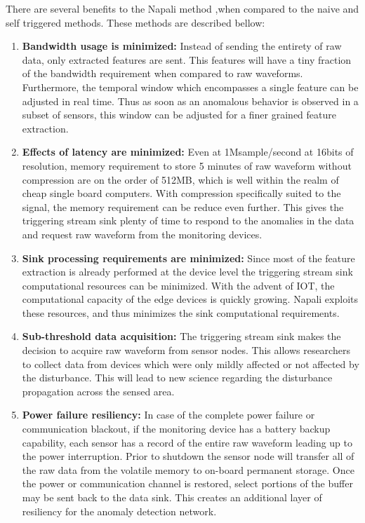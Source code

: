 There are several benefits to the Napali method ,when compared to the naive and self triggered methods. These methods are described bellow:
\begin{enumerate}
	\item \textbf{Bandwidth usage is minimized:} Instead of sending the entirety of raw data, only extracted features are sent. This features will have a tiny fraction of the bandwidth requirement when compared to raw waveforms. Furthermore, the temporal window which encompasses a single feature can be adjusted in real time. Thus as soon as an anomalous behavior is observed in a subset of sensors, this window can be adjusted for a finer grained feature extraction.
	\item \textbf{Effects of latency are minimized:} Even at 1Msample/second at 16bits of resolution, memory requirement to store 5 minutes of raw waveform without compression are on the order of 512MB, which is well within the realm of cheap single board computers. With compression specifically suited to the signal, the memory requirement can be reduce even further. This gives the triggering stream sink plenty of time to respond to the anomalies in the data and request raw waveform from the monitoring devices.
	\item \textbf{Sink processing requirements are minimized:} Since most of the feature extraction is already performed at the device level the triggering stream sink computational resources can be minimized. With the advent of IOT, the computational capacity of the edge devices is quickly growing. Napali exploits these resources, and thus minimizes the sink computational requirements.
	\item \textbf{Sub-threshold data acquisition:} The triggering stream sink makes the decision to acquire raw waveform from sensor nodes. This allows researchers to collect data from devices which were only mildly affected or not affected by the disturbance. This will lead to new science regarding the disturbance propagation across the sensed area.
	\item \textbf{Power failure resiliency:} In case of the complete power failure or communication blackout, if the monitoring device has a battery backup capability, each sensor has a record of the entire raw waveform leading up to the power interruption. Prior to shutdown the sensor node will transfer all of the raw data from the volatile memory to on-board permanent storage. Once the power or communication channel is restored, select portions of the buffer may be sent back to the data sink. This creates an additional layer of resiliency for the anomaly detection network.

\end{enumerate}
